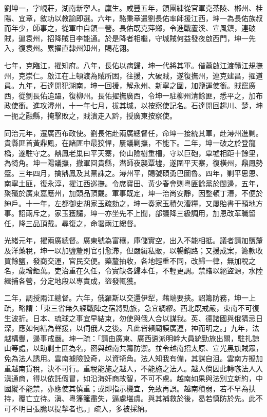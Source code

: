 \begin{pinyinscope}
劉坤一，字峴莊，湖南新寧人。廩生。咸豐五年，領團練從官軍克茶陵、郴州、桂陽、宜章，敘功以教諭即選。六年，駱秉章遣劉長佑率師援江西，坤一為長佑族叔而年少，師事之，從軍中自領一營。長佑既克萍鄉，令進戰蘆溪、宣風鎮，連破賊，逼袁州，招降賊目李能通。於是降者相繼，守城賊何益發夜啟西門，坤一先入，復袁州。累擢直隸州知州，賜花翎。

七年，克臨江，擢知府。八年，長佑以病歸，坤一代將其軍。偕蕭啟江渡贛江規撫州，克崇仁。啟江在上頓渡為賊所困，往援，大破賊，遂復撫州，連克建昌，擢道員。九年，石達開犯湖南，坤一回援，解永州、新寧之圍，加鹽運使銜。賊竄廣西，從劉長佑追躡，復柳州。長佑擢撫廣西，令坤一駐柳州清餘匪，悉平之，加布政使銜。進攻潯州，十一年七月，拔其城，以按察使記名。石達開回趨川、楚，坤一扼之融縣，掩擊敗之，賊潰走入黔，授廣東按察使。

同治元年，遷廣西布政使。劉長佑赴兩廣總督任，命坤一接統其軍，赴潯州進剿。貴縣匪首黃鼎鳳，在諸匪中最狡悍，屢議剿撫，不能下。二年，坤一破之於登龍橋，遂駐守之。鼎鳳老巢曰平天寨，倚山險樹重柵，守以巨砲，覃墟相距十餘里，為犄角。坤一陽議撫，撤軍回貴縣，潛師夜襲覃墟，遂圍平天寨，復橫州，鼎鳳勢蹙。三年四月，擒鼎鳳及其黨誅之。潯州平，賜號碩勇巴圖魯。四年，剿平思恩、南寧土匪，復永淳，擢江西巡撫。令席寶田、黃少春會剿粵匪餘黨於閩邊，五年，聚殲於廣東嘉應州，加頭品頂戴。軍事既定，坤一治尚安靜，因整頓丁漕，不便於紳戶。十一年，左都御史胡家玉疏劾之，坤一奏家玉積欠漕糧，又屢貽書干預地方事。詔兩斥之，家玉獲譴，坤一亦坐先不上聞，部議降三級調用，加恩改革職留任，降三品頂戴。尋復之，命署兩江總督。

光緒元年，擢兩廣總督。廣東號為富穰，庫儲實空，出入不能相抵。議者請加鹽釐及洋藥稅，坤一以加鹽釐則官引愈滯，但嚴緝私販，以暢銷路；又援成案，籌款收買餘鹽，發商交運，官民交便。藥釐抽收，各地輕重不同，改歸一律，無加稅之名，歲增鉅萬。吏治重在久任，令實缺各歸本任，不輕更調。禁賭以絕盜源，水陸緝捕各營，分定地段以專責成，盜發輒獲。

二年，調授兩江總督。六年，俄羅斯以交還伊犁，藉端要挾。詔籌防務，坤一上疏，略謂：「東三省無久經戰陣之宿將勁旅，急宜綢繆。西北既戒嚴，東南不可復生波折。日本、琉球之事宜早結束，勿使與俄人合以謀我。英、德諸國與俄猜忌日深，應如何結為聲援，以伺俄人之後。凡此皆賴廟謨廣運，神而明之。」九年，法越構釁，邊事戒嚴。坤一疏：「請由廣東、廣西遴派明幹大員統勁旅出關，駐扎諒山等處，以助剿土匪為名，密與越南共籌防禦。並令越南招太原、宣光黑旗賊眾，免為法人誘用。雲南據險設奇，以資犄角。法人知我有備，其謀自沮。雲南方擬加重越南貨稅，決不可行。重稅能施之越人，不能施之法人。越人倘因此轉嗾法人入滇通商，得以依託假冒，如沿海奸商故智，不可不慮。越南如果與法別立新約，中國縱不能禁，亦應使其慎重；或即指示機宜，免致再誤。越南積弱，若不早為扶持，覆亡立待。滇、粵籓籬盡失，逼處堪虞。與其補救於後，曷若慎防於先。此不可不明目張膽以提挈者也。」疏入，多被採納。


\end{pinyinscope}
